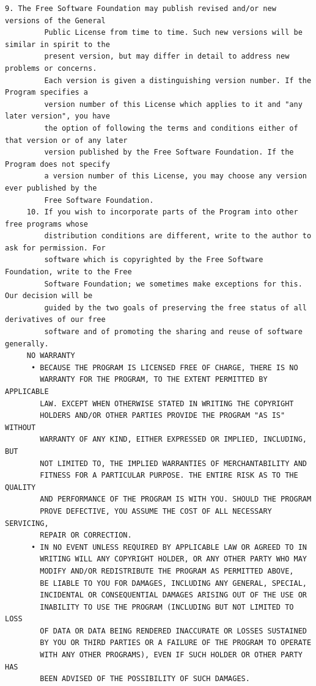 \begin{lstlisting}[basicstyle=\ttfamily\footnotesize,breaklines=true]
      9. The Free Software Foundation may publish revised and/or new versions of the General
         Public License from time to time. Such new versions will be similar in spirit to the
         present version, but may differ in detail to address new problems or concerns.
         Each version is given a distinguishing version number. If the Program specifies a
         version number of this License which applies to it and "any later version", you have
         the option of following the terms and conditions either of that version or of any later
         version published by the Free Software Foundation. If the Program does not specify
         a version number of this License, you may choose any version ever published by the
         Free Software Foundation.
     10. If you wish to incorporate parts of the Program into other free programs whose
         distribution conditions are different, write to the author to ask for permission. For
         software which is copyrighted by the Free Software Foundation, write to the Free
         Software Foundation; we sometimes make exceptions for this. Our decision will be
         guided by the two goals of preserving the free status of all derivatives of our free
         software and of promoting the sharing and reuse of software generally.
     NO WARRANTY
      • BECAUSE THE PROGRAM IS LICENSED FREE OF CHARGE, THERE IS NO
        WARRANTY FOR THE PROGRAM, TO THE EXTENT PERMITTED BY APPLICABLE
        LAW. EXCEPT WHEN OTHERWISE STATED IN WRITING THE COPYRIGHT
        HOLDERS AND/OR OTHER PARTIES PROVIDE THE PROGRAM "AS IS" WITHOUT
        WARRANTY OF ANY KIND, EITHER EXPRESSED OR IMPLIED, INCLUDING, BUT
        NOT LIMITED TO, THE IMPLIED WARRANTIES OF MERCHANTABILITY AND
        FITNESS FOR A PARTICULAR PURPOSE. THE ENTIRE RISK AS TO THE QUALITY
        AND PERFORMANCE OF THE PROGRAM IS WITH YOU. SHOULD THE PROGRAM
        PROVE DEFECTIVE, YOU ASSUME THE COST OF ALL NECESSARY SERVICING,
        REPAIR OR CORRECTION.
      • IN NO EVENT UNLESS REQUIRED BY APPLICABLE LAW OR AGREED TO IN
        WRITING WILL ANY COPYRIGHT HOLDER, OR ANY OTHER PARTY WHO MAY
        MODIFY AND/OR REDISTRIBUTE THE PROGRAM AS PERMITTED ABOVE,
        BE LIABLE TO YOU FOR DAMAGES, INCLUDING ANY GENERAL, SPECIAL,
        INCIDENTAL OR CONSEQUENTIAL DAMAGES ARISING OUT OF THE USE OR
        INABILITY TO USE THE PROGRAM (INCLUDING BUT NOT LIMITED TO LOSS
        OF DATA OR DATA BEING RENDERED INACCURATE OR LOSSES SUSTAINED
        BY YOU OR THIRD PARTIES OR A FAILURE OF THE PROGRAM TO OPERATE
        WITH ANY OTHER PROGRAMS), EVEN IF SUCH HOLDER OR OTHER PARTY HAS
        BEEN ADVISED OF THE POSSIBILITY OF SUCH DAMAGES.
\end{lstlisting}

